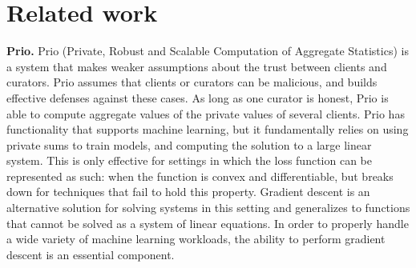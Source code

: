 \section{Related work}
\label{sec:related}


\textbf{Prio.}
Prio (Private, Robust and Scalable Computation of Aggregate
Statistics) \cite{Corrigan-Gibbs:2017} is a system that makes weaker 
assumptions about the trust between clients and curators. Prio assumes
that clients or curators can be malicious, and builds effective
defenses against these cases. As long as one curator is honest, Prio is
able to compute aggregate values of the private values of several
clients. Prio has functionality that supports machine learning, but it
fundamentally relies on using private sums to train models, and
computing the solution to a large linear system. This is only effective
for settings in which the loss function can be represented as such:
when the function is convex and differentiable, but breaks down for
techniques that fail to hold this property. Gradient descent is an
alternative solution for solving systems in this setting and
generalizes to functions that cannot be solved as a system of linear
equations. In order to properly handle a wide variety of machine
learning workloads, the ability to perform gradient descent is an
essential component. 
%


